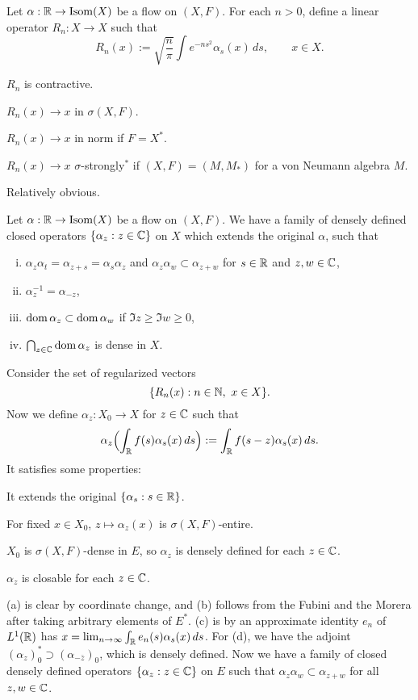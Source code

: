 \documentclass{../../small}
\begin{document}
\begin{prop}
Let $\alpha:\mathbb{R}\to\operatorname{Isom}(X)$ be a flow on $(X,F)$.
For each $n>0$, define a linear operator $R_n:X\to X$ such that
\[R_n(x):=\sqrt{\frac n\pi}\int e^{-ns^2}\alpha_s(x)\,ds,\qquad x\in X.\]
\begin{parts}
\item $R_n$ is contractive.
\item $R_n(x)\to x$ in $\sigma(X,F)$.
\item $R_n(x)\to x$ in norm if $F=X^*$.
\item $R_n(x)\to x$ $\sigma$-strongly$^*$ if $(X,F)=(M,M_*)$ for a von Neumann algebra $M$.
\end{parts}
\end{prop}
\begin{pf}
Relatively obvious.
\end{pf}


\begin{thm}
Let $\alpha:\mathbb{R}\to\operatorname{Isom}(X)$ be a flow on $(X,F)$.
We have a family of densely defined closed operators $\{\alpha_z:z\in\mathbb{C}\}$ on $X$ which extends the original $\alpha$, such that
\begin{enumerate}[(i)]
\item $\alpha_z\alpha_t=\alpha_{z+s}=\alpha_s\alpha_z$ and $\alpha_z\alpha_w\subset\alpha_{z+w}$ for $s\in\mathbb{R}$ and $z,w\in\mathbb{C}$,
\item $\alpha_z^{-1}=\alpha_{-z}$,
\item $\operatorname{dom}\alpha_z\subset\operatorname{dom}\alpha_w$ if $\Im z\ge\Im w\ge0$,
\item $\bigcap_{z\in\mathbb{C}}\operatorname{dom}\alpha_z$ is dense in $X$.
\end{enumerate}
\end{thm}
\begin{pf}
Consider the set of regularized vectors
\[\{R_n(x):n\in\mathbb{N},\ x\in X\}.\]
Now we define $\alpha_z:X_0\to X$ for $z\in\mathbb{C}$ such that
\[\alpha_z\Bigl(\int_{\mathbb{R}} f(s)\alpha_s(x)\,ds\Bigr):=\int_{\mathbb{R}} f(s-z)\alpha_s(x)\,ds.\]
It satisfies some properties:
\begin{parts}
\item It extends the original $\{\alpha_s:s\in\mathbb{R}\}$.
\item For fixed $x\in X_0$, $z\mapsto\alpha_z(x)$ is $\sigma(X,F)$-entire.
\item $X_0$ is $\sigma(X,F)$-dense in $E$, so $\alpha_z$ is densely defined for each $z\in\mathbb{C}$.
\item $\alpha_z$ is closable for each $z\in\mathbb{C}$.
\end{parts}
(a) is clear by coordinate change, and (b) follows from the Fubini and the Morera after taking arbitrary elements of $E^*$.
(c) is by an approximate identity $e_n$ of $L^1(\mathbb{R})$ has $x=\lim_{n\to\infty}\int_{\mathbb{R}} e_n(s)\alpha_s(x)\,ds$.
For (d), we have the adjoint $(\alpha_z)_0^*\supset(\alpha_{-\bar z})_0$, which is densely defined.
Now we have a family of closed densely defined operators $\{\alpha_z:z\in\mathbb{C}\}$ on $E$ such that $\alpha_z\alpha_w\subset\alpha_{z+w}$ for all $z,w\in\mathbb{C}$.
\end{pf}
\end{document}
